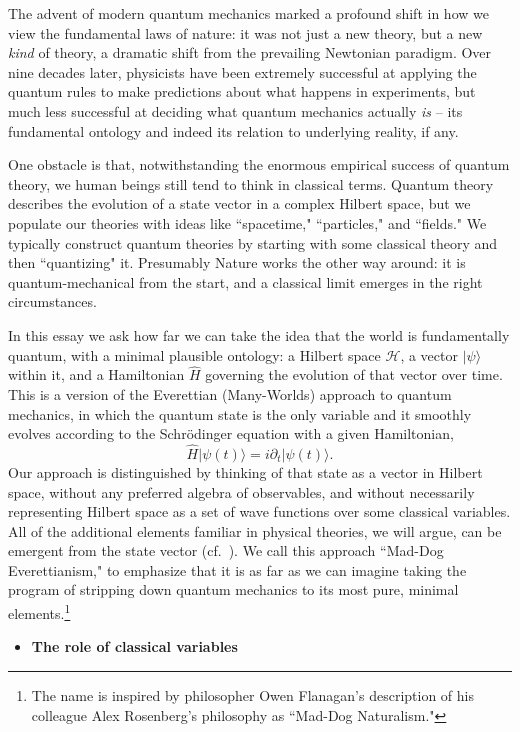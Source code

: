 \documentclass[12pt,english]{article}
\newcommand{\be}{\begin{equation}}
\newcommand{\ee}{\end{equation}}
\newcommand{\HH}{\mathcal{H}}
\begin{document}
The advent of modern quantum mechanics marked a profound shift in how we view the fundamental laws of nature: it was not just a new theory, but a new \emph{kind} of theory, a dramatic shift from the prevailing Newtonian paradigm.
Over nine decades later, physicists have been extremely successful at applying the quantum rules to make predictions about what happens in experiments, but much less successful at deciding what quantum mechanics actually \emph{is} -- its fundamental ontology and indeed its relation to underlying reality, if any.

One obstacle is that, notwithstanding the enormous empirical success of quantum theory, we human beings still tend to think in classical terms.
Quantum theory describes the evolution of a state vector in a complex Hilbert space, but we populate our theories with ideas like ``spacetime," ``particles," and ``fields."
We typically construct quantum theories by starting with some classical theory and then ``quantizing" it.
Presumably Nature works the other way around: it is quantum-mechanical from the start, and a classical limit emerges in the right circumstances.

In this essay we ask how far we can take the idea that the world is fundamentally quantum, with a minimal plausible ontology: a Hilbert space $\HH$, a vector $|\psi\rangle$ within it, and a Hamiltonian $\hat H$ governing the evolution of that vector over time.
This is a version of the Everettian (Many-Worlds) approach to quantum mechanics, in which the quantum state is the only variable and it smoothly evolves according to the Schr\"odinger equation with a given Hamiltonian,
\be
  \hat H |\psi(t)\rangle = i \partial_t|\psi(t)\rangle.
\ee
Our approach is distinguished by thinking of that state as a vector in Hilbert space, without any preferred algebra of observables, and without necessarily representing Hilbert space as a set of wave functions over some classical variables.
All of the additional elements familiar in physical theories, we will argue, can be emergent from the state vector (cf.\ \cite{Giddings:2015lla}).
We call this approach ``Mad-Dog Everettianism," to emphasize that it is as far as we can imagine taking the program of stripping down quantum mechanics to its most pure, minimal elements.\footnote{The name is inspired by philosopher Owen Flanagan's description of his colleague Alex Rosenberg's philosophy as ``Mad-Dog Naturalism."}

\newpage
\begin{itemize}
\item \textbf{The role of classical variables}
\end{itemize}
\end{document}
